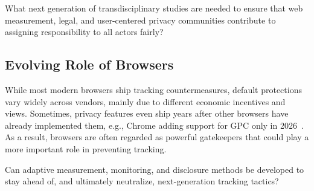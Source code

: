 \begin{opbox}
What next generation of transdisciplinary studies are needed to ensure that web measurement, legal, and user-centered privacy communities contribute to assigning responsibility to all actors fairly?
\end{opbox}



\subsection{Evolving Role of Browsers}

% 
While most modern browsers ship tracking countermeasures, default protections vary widely across vendors, mainly due to different economic incentives and views. Sometimes, privacy features even ship years after other browsers have already implemented them, e.g., Chrome adding support for GPC only in 2026~\cite{googleGlobalPrivacyControl2025}.
% 
As a result, browsers are often regarded as powerful gatekeepers that could play a more important role in preventing tracking.

\begin{opbox}
Can adaptive measurement, monitoring, and disclosure methods be developed to stay ahead of, and ultimately neutralize, next-generation tracking tactics?
\end{opbox}


